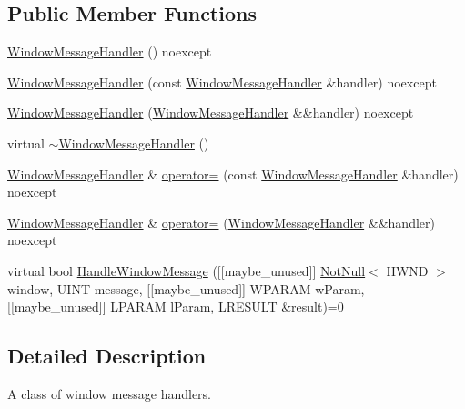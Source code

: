\subsection*{Public Member Functions}
\begin{DoxyCompactItemize}
\item 
\mbox{\hyperlink{classmage_1_1_window_message_handler_ae2213e3ff0a7c418ecfed87cfa43a8b7}{Window\+Message\+Handler}} () noexcept
\item 
\mbox{\hyperlink{classmage_1_1_window_message_handler_a2dd683eafde6c68efc55aebc8460fb0a}{Window\+Message\+Handler}} (const \mbox{\hyperlink{classmage_1_1_window_message_handler}{Window\+Message\+Handler}} \&handler) noexcept
\item 
\mbox{\hyperlink{classmage_1_1_window_message_handler_ab6fe3eac35ef7262941dae8e65841d88}{Window\+Message\+Handler}} (\mbox{\hyperlink{classmage_1_1_window_message_handler}{Window\+Message\+Handler}} \&\&handler) noexcept
\item 
virtual \mbox{\hyperlink{classmage_1_1_window_message_handler_a24eae1a24e783b22fce2c7fdd8e14fef}{$\sim$\+Window\+Message\+Handler}} ()
\item 
\mbox{\hyperlink{classmage_1_1_window_message_handler}{Window\+Message\+Handler}} \& \mbox{\hyperlink{classmage_1_1_window_message_handler_a6f48f6a94d62bee913e5f0fabc166cab}{operator=}} (const \mbox{\hyperlink{classmage_1_1_window_message_handler}{Window\+Message\+Handler}} \&handler) noexcept
\item 
\mbox{\hyperlink{classmage_1_1_window_message_handler}{Window\+Message\+Handler}} \& \mbox{\hyperlink{classmage_1_1_window_message_handler_acb05035c5d298e7a1db0e8e2c1fcb71d}{operator=}} (\mbox{\hyperlink{classmage_1_1_window_message_handler}{Window\+Message\+Handler}} \&\&handler) noexcept
\item 
virtual bool \mbox{\hyperlink{classmage_1_1_window_message_handler_a861750616c1517630e54a359d1234653}{Handle\+Window\+Message}} (\mbox{[}\mbox{[}maybe\+\_\+unused\mbox{]}\mbox{]} \mbox{\hyperlink{namespacemage_a8769f9d670d6b585ea306cb1062af94b}{Not\+Null}}$<$ H\+W\+ND $>$ window, U\+I\+NT message, \mbox{[}\mbox{[}maybe\+\_\+unused\mbox{]}\mbox{]} W\+P\+A\+R\+AM w\+Param, \mbox{[}\mbox{[}maybe\+\_\+unused\mbox{]}\mbox{]} L\+P\+A\+R\+AM l\+Param, L\+R\+E\+S\+U\+LT \&result)=0
\end{DoxyCompactItemize}


\subsection{Detailed Description}
A class of window message handlers. 

